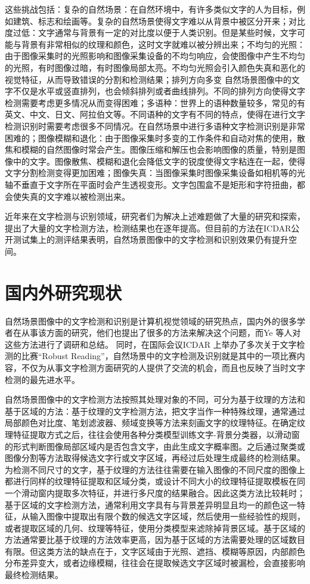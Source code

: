     这些挑战包括：复杂的自然场景：在自然环境中，有许多类似文字的人为目标，例如建筑、标志和绘画等。复杂的自然场景使得文字难以从背景中被区分开来；对比度过低：文字通常与背景有一定的对比度以便于人类识别。但是某些时候，文字可能与背景有非常相似的纹理和颜色，这时文字就难以被分辨出来；不均匀的光照：由于图像采集时的光照影响和图像采集设备的不均匀响应，会使图像中产生不均匀的光照，有时图像过暗，有时图像局部太亮。不均匀光照会引入颜色失真和恶化的视觉特征，从而导致错误的分割和检测结果；排列方向多变 自然场景图像中的文字不仅是水平或竖直排列，也会倾斜排列或者曲线排列。不同的排列方向使得文字检测需要考虑更多情况从而变得困难；多语种：世界上的语种数量较多，常见的有英文、中文、日文、阿拉伯文等。不同语种的文字有不同的特点，使得在进行文字检测识别时需要考虑很多不同情况。在自然场景中进行多语种文字检测识别是非常困难的；图像模糊和退化：由于图像采集时多变的工作条件和自动对焦的使用，散焦和模糊的自然图像时常会产生。图像压缩和解压也会影响图像的质量，特别是图像中的文字。图像散焦、模糊和退化会降低文字的锐度使得文字粘连在一起，使得文字分割检测变得更加困难；图像失真：当图像采集时图像采集设备如相机等的光轴不垂直于文字所在平面时会产生透视变形。文字包围盒不是矩形和字符扭曲，都会使失真的文字难以被检测出来。

    近年来在文字检测与识别领域，研究者们为解决上述难题做了大量的研究和探索，提出了大量的文字检测方法，检测结果也在逐年提高。但目前的方法在ICDAR公开测试集上的测评结果表明，自然场景图像中的文字检测和识别效果仍有提升空间。

    \section{国内外研究现状}

    自然场景图像中的文字检测和识别是计算机视觉领域的研究热点，国内外的很多学者在从事该方面的研究，他们也提出了很多的方法来解决这个问题，而Ye 等人\cite{Ye2015Text}对这些方法进行了调研和总结。 同时，在国际会议ICDAR 上举办了多次关于文字检测的比赛“Robust Reading”\cite{Karatzas2013ICDAR}，自然场景中的文字检测及识别就是其中的一项比赛内容，不仅为从事文字检测方面研究的人提供了交流的机会，而且也反映了当时文字检测的最先进水平。

    自然场景图像中的文字检测方法按照其处理对象的不同，可分为基于纹理的方法和基于区域的方法：基于纹理的文字检测方法，把文字当作一种特殊纹理，通常通过局部颜色对比度、笔划滤波器、频域变换等方法来刻画文字的纹理特征。在确定纹理特征提取方式之后，往往会使用各种分类模型训练文字-背景分类器，以滑动窗的形式判断图像局部区域内是否包含文字，由此生成文字概率图。之后通过聚类或图像分割等方法取得候选文字行或文字区域，再经过后处理生成最终的检测结果。为检测不同尺寸的文字，基于纹理的方法往往需要在输入图像的不同尺度的图像上都进行同样的纹理特征提取和区域分类，或设计不同大小的纹理特征提取模板在同一个滑动窗内提取多次特征，并进行多尺度的结果融合。因此这类方法比较耗时；基于区域的文字检测方法，通常利用文字具有与背景差异明显且均一的颜色这一特征，从输入图像中提取出有限个数的候选文字区域，然后使用一些经验性的规则，或者提取区域的几何、纹理等特征，使用分类模型来滤除掉背景区域。基于区域的方法通常要比基于纹理的方法效率更高，因为基于区域的方法需要处理的区域数目有限。但这类方法的缺点在于，文字区域由于光照、遮挡、模糊等原因，内部颜色分布差异变大，或者边缘模糊，往往会在提取候选文字区域时被漏检，会直接影响最终检测结果。

